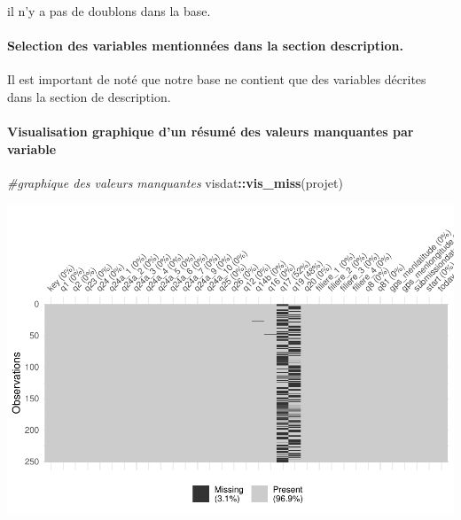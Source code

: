 \documentclass[
]{article}
\newenvironment{Shaded}{\begin{snugshade}}{\end{snugshade}}
\newcommand{\CommentTok}[1]{\textcolor[rgb]{0.56,0.35,0.01}{\textit{#1}}}
\newcommand{\FunctionTok}[1]{\textcolor[rgb]{0.13,0.29,0.53}{\textbf{#1}}}
\newcommand{\NormalTok}[1]{#1}
\newcommand{\SpecialCharTok}[1]{\textcolor[rgb]{0.81,0.36,0.00}{\textbf{#1}}}
\begin{document}
\hfill\break

il n'y a pas de doublons dans la base.\\

\hypertarget{selection-des-variables-mentionnuxe9es-dans-la-section-description.}{%
\paragraph{Selection des variables mentionnées dans la section
description.}\label{selection-des-variables-mentionnuxe9es-dans-la-section-description.}}

\hfill\break
Il est important de noté que notre base ne contient que des variables
décrites dans la section de description.\\

\hypertarget{visualisation-graphique-dun-ruxe9sumuxe9-des-valeurs-manquantes-par-variable}{%
\paragraph{Visualisation graphique d'un résumé des valeurs manquantes
par
variable}\label{visualisation-graphique-dun-ruxe9sumuxe9-des-valeurs-manquantes-par-variable}}

\hfill\break

\begin{Shaded}
\begin{Highlighting}[]
\CommentTok{\#graphique des valeurs manquantes}
\NormalTok{visdat}\SpecialCharTok{::}\FunctionTok{vis\_miss}\NormalTok{(projet)}
\end{Highlighting}
\end{Shaded}

\begin{center}\includegraphics{Projet_R_ISE_1_files/figure-latex/unnamed-chunk-4-1} \end{center}
\end{document}
